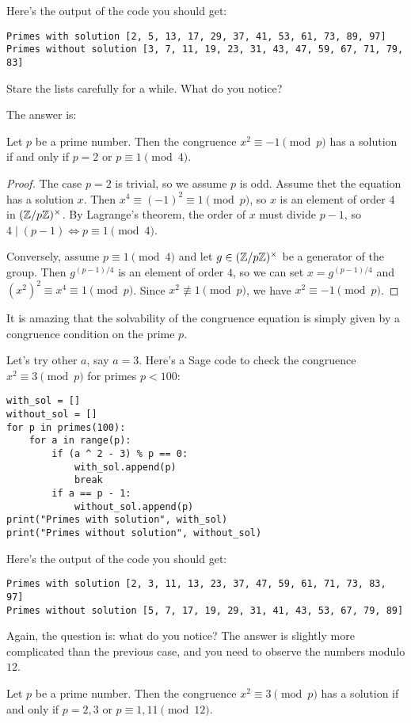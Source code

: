 Here's the output of the code you should get:
\begin{verbatim}
Primes with solution [2, 5, 13, 17, 29, 37, 41, 53, 61, 73, 89, 97]
Primes without solution [3, 7, 11, 19, 23, 31, 43, 47, 59, 67, 71, 79, 83]
\end{verbatim}

Stare the lists carefully for a while. What do you notice?

\newpage
The answer is:
\begin{theorem}
    \label{thm:m1sq}
    Let $p$ be a prime number. Then the congruence $x^2 \equiv -1 \pmod{p}$ has a solution if and only if $p = 2$ or $p \equiv 1 \pmod{4}$.
\end{theorem}
\begin{proof}
    The case $p = 2$ is trivial, so we assume $p$ is odd.
    Assume thet the equation has a solution $x$.
    Then $x^4 \equiv (-1)^2 \equiv 1 \pmod{p}$, so $x$ is an element of order $4$ in $(\mathbb{Z} / p\mathbb{Z})^\times$. 
    By Lagrange's theorem, the order of $x$ must divide $p - 1$, so $4 \mid (p - 1) \Leftrightarrow p \equiv 1 \pmod{4}$.

    Conversely, assume $p \equiv 1 \pmod{4}$ and let $g \in (\mathbb{Z} / p \mathbb{Z})^\times$ be a generator of the group.
    Then $g^{(p - 1) / 4}$ is an element of order $4$, so we can set $x = g^{(p - 1) / 4}$ and $(x^2)^2 \equiv x^4 \equiv 1 \pmod{p}$.
    Since $x^2 \not\equiv 1 \pmod{p}$, we have $x^2 \equiv -1 \pmod{p}$.
\end{proof}

It is amazing that the solvability of the congruence equation is simply given by a congruence condition on the prime $p$.

Let's try other $a$, say $a = 3$.
Here's a Sage code to check the congruence $x^2 \equiv 3 \pmod{p}$ for primes $p < 100$:
\begin{verbatim}
with_sol = []
without_sol = []
for p in primes(100):
    for a in range(p):
        if (a ^ 2 - 3) % p == 0:
            with_sol.append(p)
            break
        if a == p - 1:
            without_sol.append(p)
print("Primes with solution", with_sol)
print("Primes without solution", without_sol)
\end{verbatim}
Here's the output of the code you should get:
\begin{verbatim}
Primes with solution [2, 3, 11, 13, 23, 37, 47, 59, 61, 71, 73, 83, 97]
Primes without solution [5, 7, 17, 19, 29, 31, 41, 43, 53, 67, 79, 89]
\end{verbatim}
Again, the question is: what do you notice?
The answer is slightly more complicated than the previous case, and you need to observe the numbers modulo $12$.
\begin{theorem}
    \label{thm:m3sq}
    Let $p$ be a prime number. Then the congruence $x^2 \equiv 3 \pmod{p}$ has a solution if and only if $p = 2, 3$ or $p \equiv 1, 11 \pmod{12}$.
\end{theorem}

